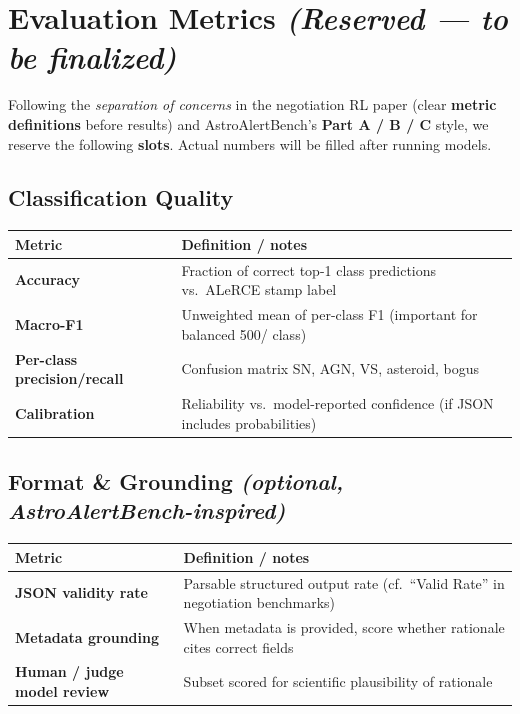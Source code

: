 \documentclass[11pt,a4paper]{article}
\begin{document}
\section{Evaluation Metrics \textit{(Reserved --- to be finalized)}}

Following the \textit{separation of concerns} in the negotiation RL paper (clear \textbf{metric definitions} before results) and AstroAlertBench's \textbf{Part A / B / C} style, we reserve the following \textbf{slots}. Actual numbers will be filled after running models.

\subsection{Classification Quality}

\begin{tabularx}{\textwidth}{@{}l X@{}}
\toprule
\textbf{Metric} & \textbf{Definition / notes} \\
\midrule
\textbf{Accuracy} & Fraction of correct top-1 class predictions vs.\ ALeRCE stamp label \\
\textbf{Macro-F1} & Unweighted mean of per-class F1 (important for balanced 500/ class) \\
\textbf{Per-class precision/recall} & Confusion matrix SN, AGN, VS, asteroid, bogus \\
\textbf{Calibration} & Reliability vs.\ model-reported confidence (if JSON includes probabilities) \\
\bottomrule
\end{tabularx}

\subsection{Format \& Grounding \textit{(optional, AstroAlertBench-inspired)}}

\begin{tabularx}{\textwidth}{@{}l X@{}}
\toprule
\textbf{Metric} & \textbf{Definition / notes} \\
\midrule
\textbf{JSON validity rate} & Parsable structured output rate (cf.\ ``Valid Rate'' in negotiation benchmarks) \\
\textbf{Metadata grounding} & When metadata is provided, score whether rationale cites correct fields \\
\textbf{Human / judge model review} & Subset scored for scientific plausibility of rationale \\
\bottomrule
\end{tabularx}
\end{document}
